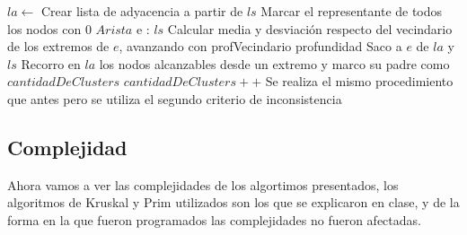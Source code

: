 \documentclass[11pt,a4paper]{article}
\begin{document}
\begin{codebox}
\li $la \gets $ Crear lista de adyacencia a partir de $ls$
\li Marcar el representante de todos los nodos con $0$
\li 
\li \For $Arista$ e : $ls$ \Do
\li 	{} \Then
\li			{} \Then
\li 			Calcular media y desviación respecto del vecindario de los 
\zi				extremos de $e$, avanzando con profVecindario profundidad
\li 			{} \Then
\li 				Saco a $e$ de $la$ y $ls$
\li 				Recorro en $la$ los nodos alcanzables desde un extremo y marco
\zi					su padre como $cantidadDeClusters$
\li 				$cantidadDeClusters++$
				\End
\li 		\Else
\li				Se realiza el mismo procedimiento que antes pero se utiliza 
\zi 			el segundo criterio de inconsistencia
			\End
		\End
	\End
\end{codebox}

\subsection{Complejidad}
Ahora vamos a ver las complejidades de los algortimos presentados, los algoritmos de Kruskal y Prim utilizados son los que se explicaron en clase, y de la forma en la que fueron programados las complejidades no fueron afectadas.
\\
\end{document}
